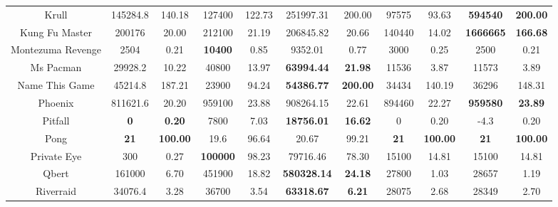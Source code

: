 \documentclass[nohyperref]{article}
\newcommand{\best}[1]{\textbf{#1}}
\theoremstyle{plain}
\begin{document}
\begin{table}[!hb]
\begin{center}
\begin{tabular}{ |c| c c| c c| c c| c c| c c| }
 Krull              & 145284.8          & 140.18            & 127400          & 122.73         & 251997.31            &200.00                    &97575             &93.63              &\textbf{594540} &\textbf{200.00}      \\
 Kung Fu Master     & 200176            & 20.00             & 212100          & 21.19          & 206845.82            &20.66                     &140440            &14.02              &\textbf{1666665}&\textbf{166.68}\\
 Montezuma Revenge  & 2504              & 0.21              & \textbf{10400}  & 0.85           &9352.01               &0.77                      &3000              &0.25               &2500            &0.21   \\
 Ms Pacman          & 29928.2           & 10.22             & 40800           & 13.97          & \textbf{63994.44}    &\textbf{21.98}            &11536             &3.87               &11573           &3.89 \\
 Name This Game     & 45214.8           & 187.21            & 23900           & 94.24          &\textbf{54386.77}     &\textbf{200.00}           &34434             &140.19             &36296           &148.31\\
 Phoenix            & 811621.6          & 20.20             & 959100          & 23.88          &908264.15             &22.61                     &894460            &22.27              &\textbf{959580} &\textbf{23.89}\\
 Pitfall            & \textbf{0}        & \textbf{0.20}     & 7800            & 7.03           &\textbf{18756.01}     &\textbf{16.62}            &0                 &0.20               &-4.3            &0.20\\
 Pong               & \textbf{21}       & \textbf{100.00}   & 19.6            & 96.64          & 20.67                &99.21                     &\best{21}         &\textbf{100.00}    &\textbf{21}     &\textbf{100.00}\\
 Private Eye        & 300               & 0.27              & \textbf{100000} & 98.23          & 79716.46             &78.30                     &15100             &14.81              &15100           &14.81\\
 Qbert              & 161000            & 6.70              & 451900          & 18.82          &\textbf{580328.14}    &\textbf{24.18}            &27800             &1.03               &28657           &1.19\\
 Riverraid          & 34076.4           & 3.28              & 36700           & 3.54           & \textbf{63318.67}    &\textbf{6.21}             &28075             &2.68               &28349           &2.70\\

\end{tabular}
\end{center}
\end{table}
\end{document}
